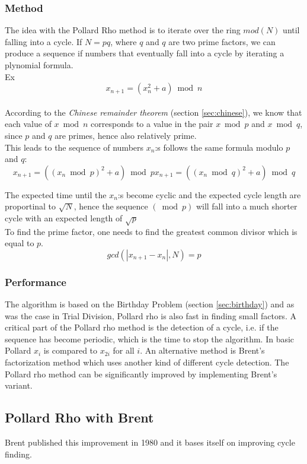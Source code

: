 \documentclass[a4paper, 12pt]{report}
\begin{document}
\subsubsection{Method}
The idea with the Pollard Rho method is to iterate over the ring $mod(N)$ until falling into a cycle. If $N = pq$, where $q$ and $q$ are two prime factors, we can produce a sequence if numbers that eventually fall into a cycle by iterating a plynomial formula. \\
Ex 
\begin{equation}
x_{n+1} = (x_n^2 + a) \bmod n
\end{equation} \\
According to the \emph{Chinese remainder theorem} (section \ref{sec:chinese}), we know that each value of $x \bmod n$ corresponds to a value in the pair $x \bmod p$ and $x \bmod q$, since $p$ and $q$ are primes, hence also relatively prime. 
\\
This leads to the sequence of numbers $x_n$:s follows the same formula modulo $p$ and $q$:
\begin{equation}
	x_{n+1} = ((x_n \bmod p)^2 + a) \bmod p
	x_{n+1} = ((x_n \bmod q)^2 + a) \bmod q
\end{equation}

The expected time until the $x_n$:s become cyclic and the expected cycle length are proportinal to $\sqrt{N}$, hence the sequence $(\bmod p)$ will fall into a much shorter cycle with an expected length of $\sqrt{p}$
\\
To find the prime factor, one needs to find the greatest common divisor which is equal to $p$.
\begin{equation}
gcd(|x_{n+1} - x_n|, N) = p
\end{equation}
\subsubsection{Performance}
The algorithm is based on the Birthday Problem (section \ref{sec:birthday}) and as was the case in Trial Division, Pollard rho is also fast in finding small factors. A critical part of the Pollard rho method is the detection of a cycle, i.e. if the sequence has become periodic, which is the time to stop the algorithm. In basic Pollard $x_i$ is compared to $x_{2i}$ for all $i$. An alternative method is Brent's factorization method which uses another kind of different cycle detection. The Pollard rho method can be significantly improved by implementing Brent's variant.

\subsection{Pollard Rho with Brent}
Brent published this improvement in 1980\cite{brentpdf} and it bases itself on improving cycle finding.
\end{document}
